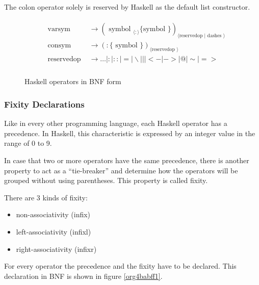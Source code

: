 \documentclass[a4paper, titlepage, twoside]{article}
\begin{document}
The colon operator solely is reserved by Haskell as the default list constructor.

\begin{figure}
\begin{displaymath}
\begin{aligned}
&\begin{array}{ll}
\text { varsym } & \rightarrow \left(\text { symbol }_{\langle:\rangle}\{\text {symbol }\}\right)_{\langle\text {reservedop }| \text { dashes }\rangle} \\
\text { consym } & \rightarrow(:\{\text { symbol }\})_{\langle\text {reservedop }\rangle} \\
\text { reservedop } & \rightarrow \ldots|:|::|=| \backslash|||<-|->|@| \sim \mid=> \\
\end{array}
\end{aligned}
\end{displaymath}
\caption{\label{org1d0471a}Haskell operators in BNF form}
\end{figure}

\subsubsection{Fixity Declarations}
\label{sec:org1f0543f}

Like in every other programming language, each Haskell operator has a precedence. In Haskell, this characteristic is expressed by an integer value in the range of 0 to 9.

In case that two or more operators have the same precedence, there is another property to act as a ``tie-breaker'' and determine how the operators will be grouped without using parentheses. This property is called fixity.

There are 3 kinds of fixity:

\begin{itemize}
\item non-associativity (infix)
\item left-associativity (infixl)
\item right-associativity (infixr)
\end{itemize}

For every operator the precedence and the fixity have to be declared. This declaration in BNF is shown in figure \ref{org4babff1}.
\end{document}
